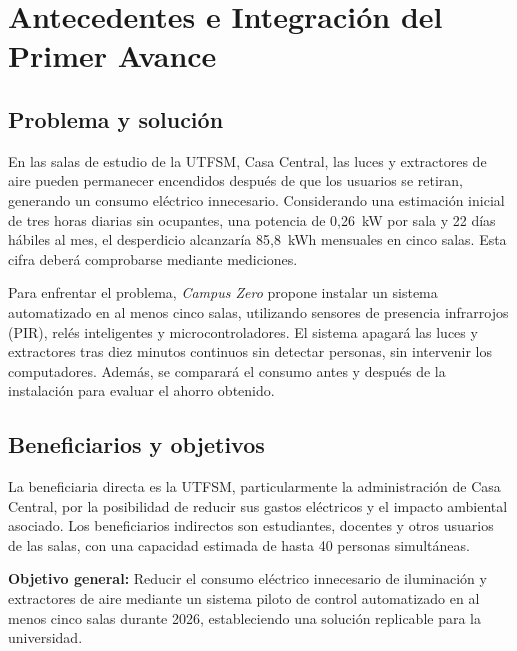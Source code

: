 

\section{Antecedentes e Integración del Primer Avance}
\label{sec:avance1}

\subsection{Problema y solución}

En las salas de estudio de la UTFSM, Casa Central, las luces y extractores de aire pueden permanecer encendidos después de que los usuarios se retiran, generando un consumo eléctrico innecesario. Considerando una estimación inicial de tres horas diarias sin ocupantes, una potencia de 0,26~kW por sala y 22 días hábiles al mes, el desperdicio alcanzaría 85,8~kWh mensuales en cinco salas. Esta cifra deberá comprobarse mediante mediciones.

Para enfrentar el problema, \textit{Campus Zero} propone instalar un sistema automatizado en al menos cinco salas, utilizando sensores de presencia infrarrojos (PIR), relés inteligentes y microcontroladores. El sistema apagará las luces y extractores tras diez minutos continuos sin detectar personas, sin intervenir los computadores. Además, se comparará el consumo antes y después de la instalación para evaluar el ahorro obtenido.

\subsection{Beneficiarios y objetivos}

La beneficiaria directa es la UTFSM, particularmente la administración de Casa Central, por la posibilidad de reducir sus gastos eléctricos y el impacto ambiental asociado. Los beneficiarios indirectos son estudiantes, docentes y otros usuarios de las salas, con una capacidad estimada de hasta 40 personas simultáneas.

\noindent\textbf{Objetivo general:} Reducir el consumo eléctrico innecesario de iluminación y extractores de aire mediante un sistema piloto de control automatizado en al menos cinco salas durante 2026, estableciendo una solución replicable para la universidad.

